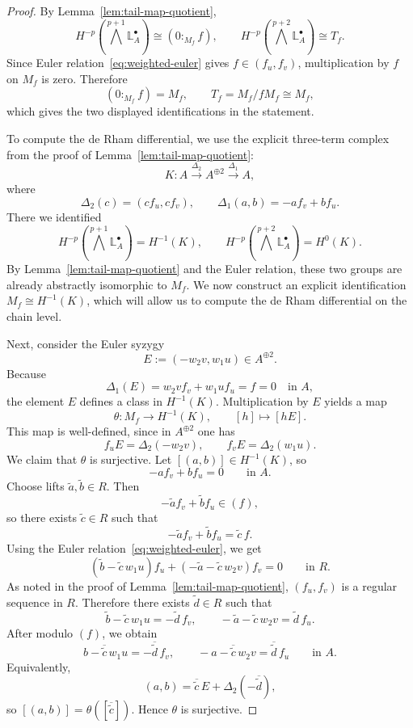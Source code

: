\documentclass[12pt,reqno]{amsart}
\begin{document}
\begin{proof}
By Lemma~\ref{lem:tail-map-quotient},
\[
H^{-p}\!\left(\bigwedge^{p+1}\mathbb{L}^{\bullet}_A\right)\cong (0:_{M_f}f),
\qquad
H^{-p}\!\left(\bigwedge^{p+2}\mathbb{L}^{\bullet}_A\right)\cong T_f.
\]
Since Euler relation~\eqref{eq:weighted-euler} gives \(f\in (f_u,f_v)\), multiplication by \(f\) on \(M_f\) is zero. Therefore
\[
(0:_{M_f}f)=M_f,
\qquad
T_f=M_f/fM_f\cong M_f,
\]
which gives the two displayed identifications in the statement.

To compute the de Rham differential, we use the explicit three-term complex from the proof of Lemma~\ref{lem:tail-map-quotient}:
\[
K:
A \xrightarrow{\Delta_2} A^{\oplus 2}\xrightarrow{\Delta_1} A,
\]
where
\[
\Delta_2(c)=(cf_u,cf_v),\qquad \Delta_1(a,b)=-af_v+bf_u.
\]
There we identified
\[
H^{-p}\!\left(\bigwedge^{p+1}\mathbb{L}^{\bullet}_A\right)=H^{-1}(K),
\qquad
H^{-p}\!\left(\bigwedge^{p+2}\mathbb{L}^{\bullet}_A\right)=H^{0}(K).
\]
By Lemma~\ref{lem:tail-map-quotient} and the Euler relation, these two groups are already abstractly isomorphic to \(M_f\). We now construct an explicit identification \(M_f\cong H^{-1}(K)\), which will allow us to compute the de Rham differential on the chain level.

Next, consider the Euler syzygy
\[
E:=(-w_2v,w_1u)\in A^{\oplus 2}.
\]
Because
\[
\Delta_1(E)=w_2v f_v+w_1u f_u=f=0\quad\text{in }A,
\]
the element $E$ defines a class in $H^{-1}(K)$. Multiplication by $E$ yields a map
\[
\theta:M_f\longrightarrow H^{-1}(K),\qquad [h]\longmapsto [hE].
\]
This map is well-defined, since in \(A^{\oplus 2}\) one has
\[
f_uE=\Delta_2(-w_2v),
\qquad
f_vE=\Delta_2(w_1u).
\]
We claim that \(\theta\) is surjective. Let \([(a,b)]\in H^{-1}(K)\), so
\[
-af_v+bf_u=0
\qquad\text{in }A.
\]
Choose lifts \(\widetilde a,\widetilde b\in R\). Then
\[
-\widetilde a f_v+\widetilde b f_u\in (f),
\]
so there exists \(\widetilde c\in R\) such that
\[
-\widetilde a f_v+\widetilde b f_u=\widetilde c\,f.
\]
Using the Euler relation~\eqref{eq:weighted-euler}, we get
\[
(\widetilde b-\widetilde c\,w_1u)f_u+(-\widetilde a-\widetilde c\,w_2v)f_v=0
\qquad\text{in }R.
\]
As noted in the proof of Lemma~\ref{lem:tail-map-quotient}, \((f_u,f_v)\) is a regular sequence in \(R\). Therefore there exists \(\widetilde d\in R\) such that
\[
\widetilde b-\widetilde c\,w_1u=-\widetilde d\,f_v,
\qquad
-\widetilde a-\widetilde c\,w_2v=\widetilde d\,f_u.
\]
After modulo \((f)\), we obtain
\[
b-\overline{\widetilde c}\,w_1u=-\overline{\widetilde d}\,f_v,
\qquad
-a-\overline{\widetilde c}\,w_2v=\overline{\widetilde d}\,f_u
\qquad
\text{in }
A.
\]
Equivalently,
\[
(a,b)=\overline{\widetilde c}\,E+\Delta_2(-\overline{\widetilde d}),
\]
so \([(a,b)]=\theta([\overline{\widetilde c}])\). Hence \(\theta\) is surjective.


\end{proof}
\end{document}
